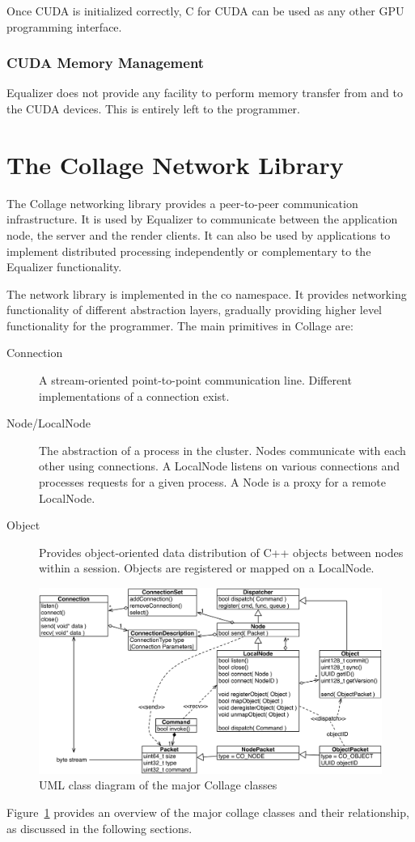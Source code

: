 \documentclass[10pt,a4]{scrartcl}
\newcommand{\fig}[1]{Figure~\ref{#1}}
\begin{document}
Once CUDA is initialized correctly, C for CUDA can be used as any other GPU 
programming interface. 

\subsubsection{CUDA Memory Management}

Equalizer does not provide any facility to perform memory transfer from and to the CUDA
devices. This is entirely left to the programmer.

\section{\label{sNetwork}The Collage Network Library}

The Collage networking library provides a peer-to-peer communication
infrastructure. It is used by Equalizer to communicate between the application
node, the server and the render clients. It can also be used by applications to
implement distributed processing independently or complementary to the Equalizer
functionality.

The network library is implemented in the \textsf{co} namespace. It provides
networking functionality of different abstraction layers, gradually providing
higher level functionality for the programmer. The main primitives in Collage
are:

\begin{description}
\item[Connection] A stream-oriented point-to-point communication
  line. Different implementations of a connection exist.
\item[Node/LocalNode] The abstraction of a process in the cluster. Nodes
  communicate with each other using connections. A LocalNode listens on various
  connections and processes requests for a given process. A Node is a proxy for
  a remote LocalNode.
\item[Object] Provides object-oriented data distribution of C++ objects between
  nodes within a session. Objects are registered or mapped on a LocalNode.
\end{description}

\begin{figure}[ht!]\center
  \includegraphics[width=\textwidth]{images/collageUML}
  {\caption{\label{fCollageUML}UML class diagram of the major Collage classes}}
\end{figure}
\fig{fCollageUML} provides an overview of the major collage classes and their
relationship, as discussed in the following sections.
\end{document}
